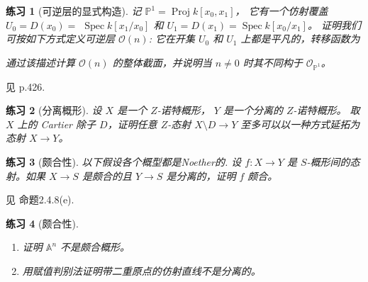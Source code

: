 \theoremstyle{plain}
\newtheorem{exercise}{练习}
\nosectionnumbers

\begin{exercise}[可逆层的显式构造]
    记 $\mathbb{P}^{1}=\operatorname{Proj} k[x_{0}, x_{1}]$，
    它有一个仿射覆盖 $U_{0}=D(x_{0})=$ $\operatorname{Spec} k[x_{1} / x_{0}]$ 
    和 $U_{1}=D(x_{1})=\operatorname{Spec} k[x_{0} / x_{1}]$。
    证明我们可按如下方式定义可逆层 $\mathcal{O}(n)$: 
    它在开集 $U_{0}$ 和 $U_{1}$ 上都是平凡的，转移函数为
    通过该描述计算 $\mathcal{O}(n)$ 的整体截面，并说明当 $n \neq 0$ 时其不同构于 $\mathcal{O}_{\mathbb{P}^1}$。
\end{exercise}

见 \cite{Va24} p.426.   

\begin{exercise}[分离概形]
    设 $X$ 是一个 $Z$-诺特概形， $Y$ 是一个分离的 $Z$-诺特概形。
    取 $X$ 上的 Cartier 除子 $D$，证明任意 $Z$-态射 $X \setminus D \rightarrow Y$ 至多可以以一种方式延拓为态射 $X \rightarrow Y$。
\end{exercise}

\begin{exercise}[颇合性]
    以下假设各个概型都是Noether的. 设 $f: X \rightarrow Y$ 是 $S$-概形间的态射。如果 $X \rightarrow S$ 是颇合的且 $Y \rightarrow S$ 是分离的，证明 $f$ 颇合。
\end{exercise}

见 \cite{Har77} 命题2.4.8(e).


\begin{exercise}[颇合性]
    \begin{enumerate}
        \item 证明 $\mathbb{A}^{n}$ 不是颇合概形。
        \item 用赋值判别法证明带二重原点的仿射直线不是分离的。
    \end{enumerate}
\end{exercise}

